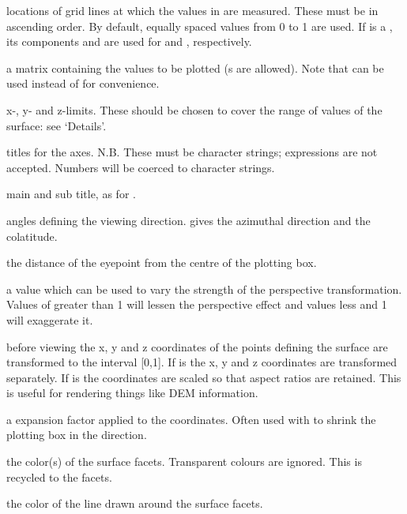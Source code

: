 \begin{Arguments}
\begin{ldescription}
\item[\code{x, y}] locations of grid lines at which the values in  are
measured.  These must be in ascending order.  By default, equally
spaced values from 0 to 1 are used.  If  is a ,
its components  and  are used for 
and , respectively.
\item[\code{z}] a matrix containing the values to be plotted (s are
allowed).  Note that  can be used instead of  for
convenience.
\item[\code{xlim, ylim, zlim}] x-, y-  and z-limits.  These should be chosen
to cover the range of values of the surface: see `Details'.
\item[\code{xlab, ylab, zlab}] titles for the axes.  N.B. These must be
character strings; expressions are not accepted.  Numbers will be
coerced to character strings.
\item[\code{main, sub}] main and sub title, as for .
\item[\code{theta, phi}] angles defining the viewing direction.
 gives the azimuthal direction and 
the colatitude.
\item[\code{r}] the distance of the eyepoint from the centre of the plotting box.
\item[\code{d}] a value which can be used to vary the strength of
the perspective transformation.  Values of  greater
than 1 will lessen the perspective effect and values less
and 1 will exaggerate it.
\item[\code{scale}] before viewing the x, y and z coordinates of the
points defining the surface are transformed to the interval
[0,1].  If  is  the x, y and z coordinates
are transformed separately.  If  is 
the coordinates are scaled so that aspect ratios are retained.
This is useful for rendering things like DEM information.
\item[\code{expand}] a expansion factor applied to the 
coordinates. Often used with  to shrink the
plotting box in the  direction.
\item[\code{col}] the color(s) of the surface facets.  Transparent colours are
ignored.  This is recycled to the  facets.
\item[\code{border}] the color of the line drawn around the surface facets.

\end{ldescription}
\end{Arguments}
